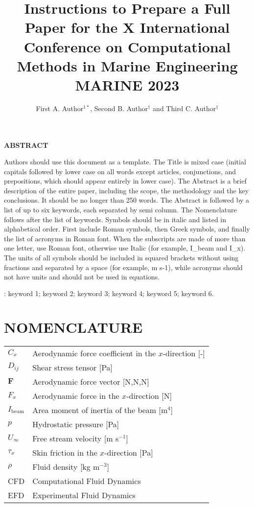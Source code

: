 \documentclass[A4paper,11pt]{marine_2023_Paper}
\title{Instructions to Prepare a Full Paper for the X International Conference on Computational Methods in Marine Engineering MARINE 2023}
\author{First A. Author$^{1*}$, Second B. Author$^{\dag}$ and Third C. Author$^{\dag}$}
\begin{document}
\maketitle
\thispagestyle{empty}
\setlength{\parskip}{0.3cm}

\begin{center}{\bf ABSTRACT}\end{center}

Authors should use this document as a template. The Title is mixed case (initial capitals followed by lower case on all words except articles, conjunctions, and prepositions, which should appear entirely in lower case). The Abstract is a brief description of the entire paper, including the scope, the methodology and the key conclusions. It should be no longer than 250 words. The Abstract is followed by a list of up to six keywords, each separated by semi column. The Nomenclature follows after the list of keywords. Symbols should be in italic and listed in alphabetical order. First include Roman symbols, then Greek symbols, and finally the list of acronyms in Roman font. When the subscripts are made of more than one letter, use Roman font, otherwise use Italic (for example, I\_beam and I\_x). The units of all symbols should be included in squared brackets without using fractions and separated by a space (for example, m s-1), while acronyms should not have units and should not be used in equations.

: keyword 1; keyword 2; keyword 3; keyword 4; keyword 5; keyword 6.

\section*{NOMENCLATURE}

\begin{tabular}{ll}
 $C_x$ & Aerodynamic force coefficient in the $x$-direction [-]\\
 $D_{ij}$ & Shear stress tensor [Pa]\\
 $\boldsymbol{F}$ & Aerodynamic force vector [N,N,N]\\
 $F_x$ & Aerodynamic force in the $x$-direction [N]\\
 $I_{\mathrm{beam}}$ & Area moment of inertia of the beam [m${}^{4}$]\\
 $p$ & Hydrostatic pressure [Pa]\\
 $U_{\infty }$ & Free stream velocity [m s${}^{-1}$]\\
${\tau }_x$ & Skin friction in the $x$-direction [Pa]\\
 $\rho $ & Fluid density [kg m${}^{-3}$]\\
 CFD &Computational Fluid Dynamics\\
 EFD &Experimental Fluid Dynamics
\end{tabular}
\end{document}
